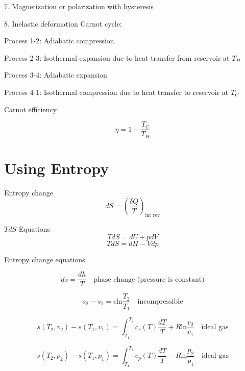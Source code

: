 \documentclass[paper=letter, fontsize=11pt]{scrartcl}
\numberwithin{equation}{section}        %
\numberwithin{figure}{section}          %
\numberwithin{table}{section}               %
\begin{document}
7. Magnetization or polarization with hysteresis

8. Inelastic deformation
\newline
\newline
Carnot cycle:

Process 1-2: Adiabatic compression

Process 2-3: Isothermal expansion due to heat transfer from reservoir at $T_H$

Process 3-4: Adiabatic expansion

Process 4-1: Isothermal compression due to heat transfer to reservoir at $T_C$

Carnot efficiency

\begin{equation}
    \eta = 1 - \frac{T_C}{T_H}
\end{equation}


\newpage
\section{Using Entropy}

Entropy change
\begin{equation}
    d S = \left(\frac{\delta Q}{T}\right)_\text{int rev}
\end{equation}

$TdS$ Equations
\begin{equation}
    T dS = dU + p dV
\end{equation}
\begin{equation}
    T dS = dH - V dp
\end{equation}

Entropy change equations

\begin{equation}
    ds = \frac{dh}{T}\quad\text{phase change (pressure is constant)}
\end{equation}

\begin{equation}
    s_2-s_1 = c \text{ln}\frac{T_2}{T_1}\quad\text{incompressible}
\end{equation}

\begin{equation}
    s(T_2,v_2)-s(T_1,v_1) = \int_{T_1}^{T_2}c_v(T)\frac{dT}{T} + R \text{ln}\frac{v_2}{v_1}  \quad\text{ideal gas}
\end{equation}

\begin{equation}
    s(T_2,p_2)-s(T_1,p_1) = \int_{T_1}^{T_2}c_p(T)\frac{dT}{T} - R \text{ln}\frac{p_2}{p_1}  \quad\text{ideal gas}
\end{equation}
\end{document}
